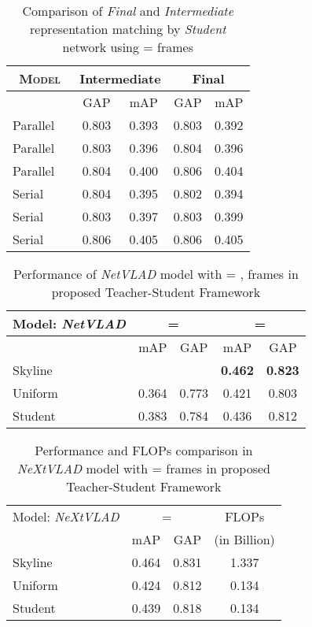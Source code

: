 \documentclass[10pt,twocolumn,letterpaper]{article}
\begin{document}
\begin{table}[t]
\centering
\begin{tabular}{ll|cc|cc}
\toprule
\multicolumn{2}{c}{\textsc{Model}}  & \multicolumn{2}{c}{Intermediate} & \multicolumn{2}{c}{Final}\ \\
\toprule
\multicolumn{2}{c|}{ }  & \textsc{GAP} & m\textsc{AP} & \textsc{GAP} & m\textsc{AP} \\
\toprule
Parallel &  & 0.803 & 0.393 & 0.803 & 0.392\\
Parallel &  & 0.803 &	0.396 & 0.804 & 0.396\\
Parallel &  &	0.804 &	0.400 & 0.806 & 0.404\\
\midrule
Serial &  & 0.804 & 0.395 & 0.802 & 0.394\\
Serial &  & 0.803	& 0.397 & 0.803 & 0.399\\
Serial &  &	0.806 &	0.405 & 0.806 & 0.405\\
\bottomrule
\end{tabular}
\caption{Comparison of \textit{Final} and \textit{Intermediate} representation matching by \textit{Student} network using = frames}
\label{tab-intermediate}
\end{table}




\begin{table}[t]
\centering
\begin{tabular}{l|cc|cc}
\toprule
  Model: \textit{NetVLAD} &  \multicolumn{ 2}{c|}{=} & \multicolumn{ 2}{c}{=} \\
\toprule
          &  mAP & GAP & mAP & GAP\\  
\midrule
  Skyline &      &     & \textbf{0.462} & \textbf{0.823} \\
  \midrule
  Uniform & 0.364 & 0.773 & 0.421 & 0.803 \\
  \midrule
  Student & 0.383 & 0.784 & 0.436 & 0.812  \\
 \bottomrule
\end{tabular}
\caption{Performance of \textit{NetVLAD} model with = ,  frames in proposed Teacher-Student Framework}
\label{tab-netvlad}
\end{table}

\begin{table}[t]
\centering
\begin{tabular}{l|cc|c}
\toprule
  Model: \textit{NeXtVLAD} &  \multicolumn{ 2}{c|}{=} & FLOPs \\
          &  mAP & GAP & (in Billion) \\
\midrule
  Skyline &  0.464 & 0.831 & 1.337 \\
  \midrule
  Uniform & 0.424 & 0.812 & 0.134 \\
  \midrule
  Student & 0.439 & 0.818 & 0.134 \\
 \bottomrule
\end{tabular}
\caption{Performance and FLOPs comparison in \textit{NeXtVLAD} model with = frames in proposed Teacher-Student Framework}
\label{tab-nextvlad}
\end{table}
\end{document}
